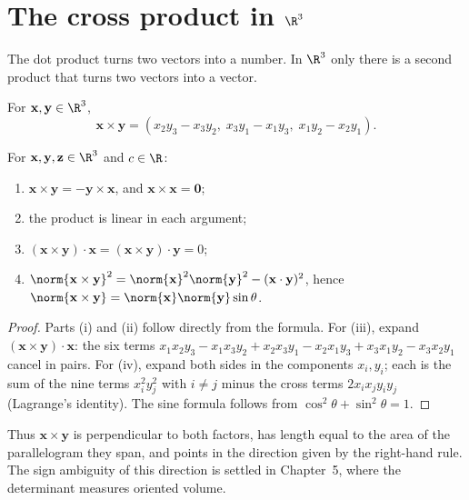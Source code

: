 \section{The cross product in $\R^3$}

The dot product turns two vectors into a number. In $\R^3$ only there is a second product that turns two vectors into a vector.

\begin{definition}
For $\mathbf{x},\mathbf{y}\in\R^3$,
\[ \mathbf{x}\times\mathbf{y}=(x_2y_3-x_3y_2,\;x_3y_1-x_1y_3,\;x_1y_2-x_2y_1). \]
\end{definition}

\begin{theorem}\label{thm:cross}
For $\mathbf{x},\mathbf{y},\mathbf{z}\in\R^3$ and $c\in\R$:
\begin{enumerate}[label=(\roman*)]
  \item $\mathbf{x}\times\mathbf{y}=-\mathbf{y}\times\mathbf{x}$, and $\mathbf{x}\times\mathbf{x}=\mathbf{0}$;
  \item the product is linear in each argument;
  \item $(\mathbf{x}\times\mathbf{y})\cdot\mathbf{x}=(\mathbf{x}\times\mathbf{y})\cdot\mathbf{y}=0$;
  \item $\norm{\mathbf{x}\times\mathbf{y}}^2=\norm{\mathbf{x}}^2\norm{\mathbf{y}}^2-(\mathbf{x}\cdot\mathbf{y})^2$, hence $\norm{\mathbf{x}\times\mathbf{y}}=\norm{\mathbf{x}}\norm{\mathbf{y}}\sin\theta$.
\end{enumerate}
\end{theorem}

\begin{proof}
Parts (i) and (ii) follow directly from the formula. For (iii), expand $(\mathbf{x}\times\mathbf{y})\cdot\mathbf{x}$: the six terms $x_1x_2y_3-x_1x_3y_2+x_2x_3y_1-x_2x_1y_3+x_3x_1y_2-x_3x_2y_1$ cancel in pairs. For (iv), expand both sides in the components $x_i,y_i$; each is the sum of the nine terms $x_i^2y_j^2$ with $i\ne j$ minus the cross terms $2x_ix_jy_iy_j$ (Lagrange's identity). The sine formula follows from $\cos^2\theta+\sin^2\theta=1$.
\end{proof}

Thus $\mathbf{x}\times\mathbf{y}$ is perpendicular to both factors, has length equal to the area of the parallelogram they span, and points in the direction given by the right-hand rule. The sign ambiguity of this direction is settled in Chapter~5, where the determinant measures oriented volume.

